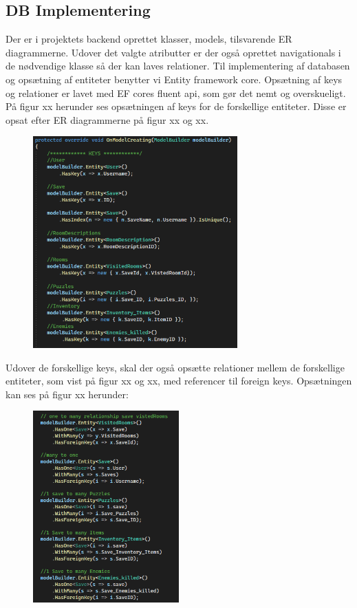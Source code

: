 \subsection{DB Implementering}

Der er i projektets backend oprettet klasser, models, tilsvarende ER diagrammerne. Udover det valgte atributter er der også oprettet navigationals i de nødvendige klasse så der kan laves relationer.
Til implementering af databasen og opsætning af entiteter benytter vi Entity framework core. Opsætning af keys og relationer er lavet med EF cores fluent api, som gør det nemt og overskueligt.
På figur xx herunder ses opsætningen af keys for de forskellige entiteter. Disse er opsat efter ER diagrammerne på figur xx og xx.\\

\begin{figure}[H]
\centering
\includegraphics[width = 0.7\textwidth]{02-Body/Images/DAL-Database/DbKeys.PNG}
\caption{}
\label{fig:DbKeys}
\end{figure}

Udover de forskellige keys, skal der også opsætte relationer mellem de forskellige entiteter, som vist på figur xx og xx, med referencer til foreign keys. 
Opsætningen kan ses på figur xx herunder: 

\begin{figure}[H]
\centering
\includegraphics[width = 0.5\textwidth]{02-Body/Images/DAL-Database/DbRelations.PNG}
\caption{}
\label{fig:DbRelations}
\end{figure}

